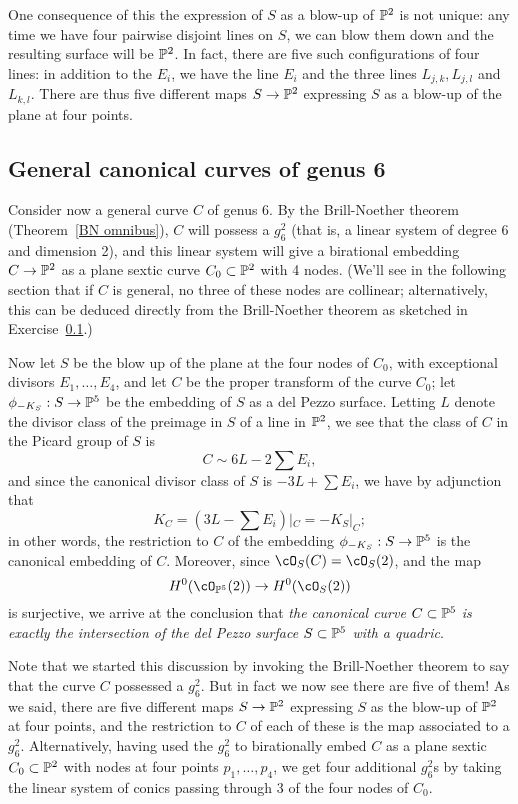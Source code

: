 One consequence of this the expression of $S$ as a blow-up of $\PP^2$ is not unique: any time we have four pairwise disjoint lines on $S$, we can blow them down and the resulting surface will be $\PP^2$. In fact, there are five such configurations of four lines: in addition to the $E_i$, we have the line $E_i$ and the three lines $L_{j,k}, L_{j,l}$ and $L_{k,l}$. There are thus five different maps $S \to \PP^2$ expressing $S$ as a blow-up of the plane at four points.

\subsection{General canonical curves of genus 6}

Consider now a general curve $C$ of genus 6. By the Brill-Noether theorem (Theorem~\ref{BN omnibus}), $C$ will possess a $g^2_6$ (that is, a linear system of degree 6 and dimension 2), and this linear system will give a birational embedding $C \to \PP^2$ as a plane sextic curve $C_0 \subset \PP^2$ with 4 nodes. (We'll see in the following section that if $C$ is general, no three of these nodes are collinear; alternatively, this can be deduced directly from the Brill-Noether theorem as sketched in Exercise~\ref{}.) 

Now let $S$ be the blow up of the plane at the four nodes of $C_0$, with exceptional divisors $E_1, \dots, E_4$, and let $C$ be the proper transform of the curve $C_0$; let $\phi_{-K_S} : S \to \PP^5$ be the embedding of $S$ as a del Pezzo surface. Letting $L$ denote the divisor class of the preimage in $S$ of a line in $\PP^2$, we see that the class of $C$ in the Picard group of $S$ is
$$
C \sim 6L - 2\sum E_i,
$$ 
and since the canonical divisor class of $S$ is $-3L + \sum E_i$, we have by adjunction that
$$
K_C = (3L - \sum E_i)|_C = -K_S|_C;
$$ 
in other words, the restriction to $C$ of the embedding $\phi_{-K_S} : S \to \PP^5$ is the canonical embedding of $C$. Moreover, since $\cO_S(C) = \cO_S(2)$, and the map 
$$
H^0(\cO_{\PP^5}(2)) \to H^0(\cO_S(2))
$$
is surjective, we arrive at the conclusion that \emph{the canonical curve $C \subset \PP^5$ is exactly the intersection of the del Pezzo surface $S \subset \PP^5$ with a quadric}.

Note that we started this discussion by invoking the Brill-Noether theorem to say that the curve $C$ possessed a $g^2_6$. But in fact we now see there are five of them! As we said, there are five different maps $S \to \PP^2$ expressing $S$ as the blow-up of $\PP^2$ at four points, and the restriction to $C$ of each of these is the map associated to a $g^2_6$. Alternatively, having used the $g^2_6$ to birationally embed $C$ as a plane sextic $C_0 \subset \PP^2$ with nodes at four points $p_1,\dots,p_4$, we get four additional $g^2_6$s by taking the linear system of conics passing through 3 of the four nodes of $C_0$.

